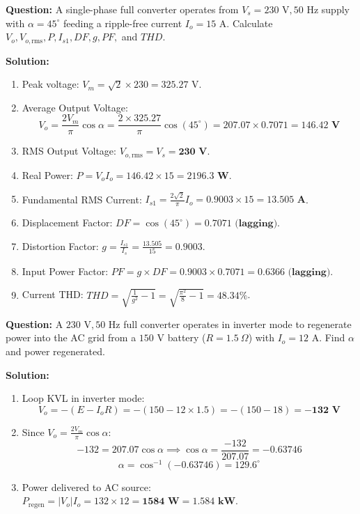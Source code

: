 \documentclass[11pt,a4paper]{article}
\begin{document}
\begin{examplebox}
\textbf{Question:} A single-phase full converter operates from $V_s = 230\text{ V}, 50\text{ Hz}$ supply with $\alpha = 45^\circ$ feeding a ripple-free current $I_o = 15\text{ A}$. Calculate $V_o, V_{o,\text{rms}}, P, I_{s1}, DF, g, PF,$ and $THD$.

\tcbline
\textbf{Solution:}
\begin{enumerate}[leftmargin=*]
  \item Peak voltage: $V_m = \sqrt{2} \times 230 = 325.27\text{ V}$.
  \item Average Output Voltage:
  \[
  V_o = \frac{2 V_m}{\pi} \cos\alpha = \frac{2 \times 325.27}{\pi} \cos(45^\circ) = 207.07 \times 0.7071 = \mathbf{146.42\text{ V}}
  \]
  \item RMS Output Voltage: $V_{o,\text{rms}} = V_s = \mathbf{230\text{ V}}$.
  \item Real Power: $P = V_o I_o = 146.42 \times 15 = \mathbf{2196.3\text{ W}}$.
  \item Fundamental RMS Current: $I_{s1} = \frac{2\sqrt{2}}{\pi} I_o = 0.9003 \times 15 = \mathbf{13.505\text{ A}}$.
  \item Displacement Factor: $DF = \cos(45^\circ) = \mathbf{0.7071\text{ (lagging)}}$.
  \item Distortion Factor: $g = \frac{I_{s1}}{I_s} = \frac{13.505}{15} = \mathbf{0.9003}$.
  \item Input Power Factor: $PF = g \times DF = 0.9003 \times 0.7071 = \mathbf{0.6366\text{ (lagging)}}$.
  \item Current THD: $THD = \sqrt{\frac{1}{g^2}-1} = \sqrt{\frac{\pi^2}{8}-1} = \mathbf{48.34\%}$.
\end{enumerate}
\end{examplebox}

\begin{examplebox}
\textbf{Question:} A $230\text{ V}, 50\text{ Hz}$ full converter operates in inverter mode to regenerate power into the AC grid from a $150\text{ V}$ battery ($R = 1.5\ \Omega$) with $I_o = 12\text{ A}$. Find $\alpha$ and power regenerated.

\tcbline
\textbf{Solution:}
\begin{enumerate}[leftmargin=*]
  \item Loop KVL in inverter mode:
  \[
  V_o = -(E - I_o R) = -(150 - 12 \times 1.5) = -(150 - 18) = \mathbf{-132\text{ V}}
  \]
  \item Since $V_o = \frac{2 V_m}{\pi} \cos\alpha$:
  \[
  -132 = 207.07 \cos\alpha \implies \cos\alpha = \frac{-132}{207.07} = -0.63746
  \]
  \[
  \alpha = \cos^{-1}(-0.63746) = \mathbf{129.6^\circ}
  \]
  \item Power delivered to AC source: $P_{\text{regen}} = |V_o| I_o = 132 \times 12 = \mathbf{1584\text{ W}} = \mathbf{1.584\text{ kW}}$.
\end{enumerate}
\end{examplebox}
\end{document}
